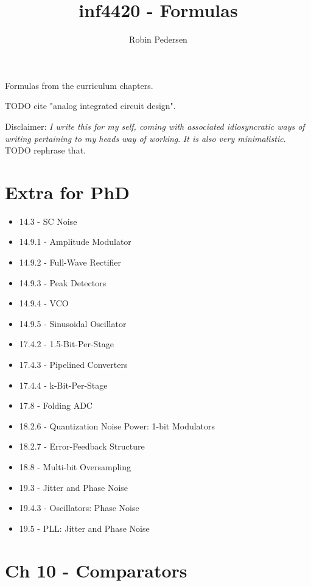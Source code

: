 \documentclass[a4paper,twocolumn]{article}
\begin{document}
  \title{inf4420 - Formulas}
  \author{Robin Pedersen}
  \maketitle

  Formulas from the curriculum chapters.

  TODO cite "analog integrated circuit design".

  Disclaimer: \emph{I write this for my self, coming with associated
  idiosyncratic ways of writing pertaining to my heads way of working}.
  \emph{It is also very minimalistic}.
  TODO rephrase that.

  \section{Extra for PhD}
    \begin{itemize}
      \item 14.3   - SC Noise
      \item 14.9.1 - Amplitude Modulator
      \item 14.9.2 - Full-Wave Rectifier
      \item 14.9.3 - Peak Detectors
      \item 14.9.4 - VCO
      \item 14.9.5 - Sinusoidal Oscillator

      \item 17.4.2 - 1.5-Bit-Per-Stage
      \item 17.4.3 - Pipelined Converters
      \item 17.4.4 - k-Bit-Per-Stage
      \item 17.8   - Folding ADC

      \item 18.2.6 - Quantization Noise Power: 1-bit Modulators
      \item 18.2.7 - Error-Feedback Structure
      \item 18.8   - Multi-bit Oversampling

      \item 19.3   - Jitter and Phase Noise
      \item 19.4.3 - Oscillators: Phase Noise
      \item 19.5   - PLL: Jitter and Phase Noise
    \end{itemize}
  \section{Ch 10 - Comparators}
\end{document}
